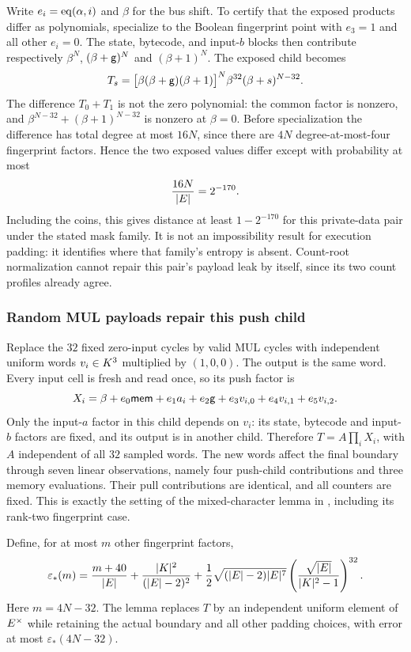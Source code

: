 Write $e_i=\operatorname{eq}(\alpha,i)$ and $\beta$ for the bus shift. To certify that the exposed products differ as polynomials, specialize to the Boolean fingerprint point with $e_3=1$ and all other $e_i=0$. The state, bytecode, and input-$b$ blocks then contribute respectively $\beta^N$, $(\beta+\mathsf{g})^N$ and $(\beta+1)^N$. The exposed child becomes
\[
 T_s=\bigl[\beta(\beta+\mathsf{g})(\beta+1)\bigr]^N
       \beta^{32}(\beta+s)^{N-32}.
\]
The difference $T_0+T_1$ is not the zero polynomial: the common factor is nonzero, and $\beta^{N-32}+(\beta+1)^{N-32}$ is nonzero at $\beta=0$. Before specialization the difference has total degree at most $16N$, since there are $4N$ degree-at-most-four fingerprint factors. Hence the two exposed values differ except with probability at most
\[
 \frac{16N}{|E|}=2^{-170}.
\]
Including the coins, this gives distance at least $1-2^{-170}$ for this private-data pair under the stated mask family. It is not an impossibility result for execution padding: it identifies where that family's entropy is absent. Count-root normalization cannot repair this pair's payload leak by itself, since its two count profiles already agree.

\subsubsection{Random MUL payloads repair this push child}

Replace the $32$ fixed zero-input cycles by valid MUL cycles with independent uniform words $v_i\in K^3$ multiplied by $(1,0,0)$. The output is the same word. Every input cell is fresh and read once, so its push factor is
\[
 X_i=\beta+e_0\mathsf{mem}+e_1a_i+e_2\mathsf{g}+
       e_3v_{i,0}+e_4v_{i,1}+e_5v_{i,2}.
\]
Only the input-$a$ factor in this child depends on $v_i$: its state, bytecode and input-$b$ factors are fixed, and its output is in another child. Therefore $T=A\prod_iX_i$, with $A$ independent of all $32$ sampled words. The new words affect the final boundary through seven linear observations, namely four push-child contributions and three memory evaluations. Their pull contributions are identical, and all counters are fixed. This is exactly the setting of the mixed-character lemma in , including its rank-two fingerprint case.

Define, for at most $m$ other fingerprint factors,
\[
 \varepsilon_*(m)=\frac{m+40}{|E|}
 +\frac{|K|^2}{(|E|-2)^2}
 +\frac12\sqrt{(|E|-2)|E|^7}
   \left(\frac{\sqrt{|E|}}{|K|^2-1}\right)^{32}.
\]
Here $m=4N-32$. The lemma replaces $T$ by an independent uniform element of $E^\times$ while retaining the actual boundary and all other padding choices, with error at most $\varepsilon_*(4N-32)$.

